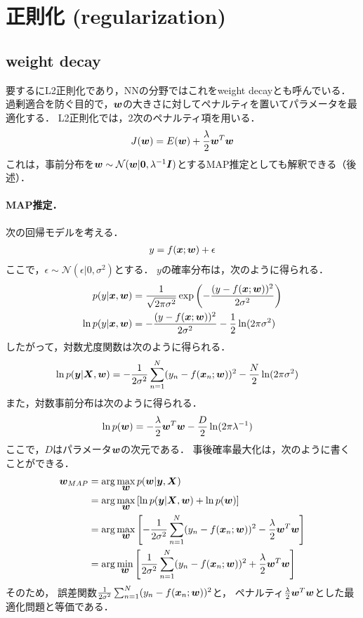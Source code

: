 \section{正則化 (regularization)}
\subsection{weight decay}
要するにL2正則化であり，NNの分野ではこれをweight decayとも呼んでいる．
過剰適合を防ぐ目的で，$\vw$の大きさに対してペナルティを置いてパラメータを最適化する．
L2正則化では，2次のペナルティ項を用いる．
\begin{align*}
J(\vw) = E(\vw) + \frac{\lambda}{2}\vw^T\vw
\end{align*}
これは，事前分布を$\vw\sim\mathcal{N}(\vw|\0,\lambda^{-1}\vI)$とするMAP推定としても解釈できる（後述）．



\paragraph{MAP推定．}
次の回帰モデルを考える．
\begin{align*}
 y = f(\vx;\vw) + \epsilon
\end{align*}
ここで，$\epsilon\sim\mathcal{N}(\epsilon|0,\sigma^2)$とする．
$y$の確率分布は，次のように得られる．
\begin{align*}
 p(y|\vx,\vw) &= \frac{1}{\sqrt{2\pi\sigma^2}}\exp\left( -\frac{(y-f(\vx;\vw))^2}{2\sigma^2} \right)
 \\
 \ln p(y|\vx,\vw) &= -\frac{(y-f(\vx;\vw))^2}{2\sigma^2} - \frac{1}{2}\ln (2\pi\sigma^2)
\end{align*}
したがって，対数尤度関数は次のように得られる．
\begin{align*}
 \ln p(\vy|\vX,\vw) &= -\frac{1}{2\sigma^2}\sum_{n=1}^N(y_n-f(\vx_n;\vw))^2 - \frac{N}{2}\ln (2\pi\sigma^2)
\end{align*}
また，対数事前分布は次のように得られる．
\begin{align*}
 \ln p(\vw) &= -\frac{\lambda}{2}\vw^T\vw - \frac{D}{2}\ln (2\pi\lambda^{-1})
\end{align*}
ここで，$D$はパラメータ$\vw$の次元である．
事後確率最大化は，次のように書くことができる．
\begin{align*}
 \vw_{MAP}
 &= \arg\max_{\vw} p(\vw|\vy,\vX)
 \\
 &= \arg\max_{\vw} \left[\ln p(\vy|\vX,\vw) + \ln p(\vw)\right]
 \\
 &= \arg\max_{\vw}\left[-\frac{1}{2\sigma^2}\sum_{n=1}^N(y_n-f(\vx_n;\vw))^2 -\frac{\lambda}{2}\vw^T\vw\right]
 \\
 &= \arg\min_{\vw}\left[\frac{1}{2\sigma^2}\sum_{n=1}^N(y_n-f(\vx_n;\vw))^2 +\frac{\lambda}{2}\vw^T\vw\right]
\end{align*}
そのため，
誤差関数$\frac{1}{2\sigma^2}\sum_{n=1}^N(y_n-f(\vx_n;\vw))^2$と，
ペナルティ$\frac{\lambda}{2}\vw^T\vw$とした最適化問題と等価である．



